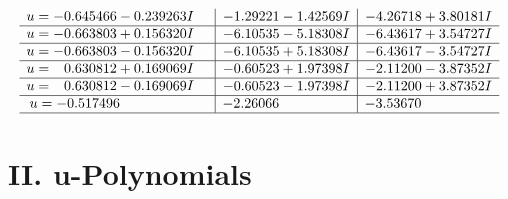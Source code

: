 \documentclass[1p]{elsarticle_modified}
\theoremstyle{definition}
\begin{document}
$$\begin{array}{c|c|c}
\begin{aligned}
u &= -0.645466 - 0.239263 I\end{aligned}
 & -1.29221 - 1.42569 I & -4.26718 + 3.80181 I \\ \hline\begin{aligned}
u &= -0.663803 + 0.156320 I\end{aligned}
 & -6.10535 - 5.18308 I & -6.43617 + 3.54727 I \\ \hline\begin{aligned}
u &= -0.663803 - 0.156320 I\end{aligned}
 & -6.10535 + 5.18308 I & -6.43617 - 3.54727 I \\ \hline\begin{aligned}
u &= \phantom{-}0.630812 + 0.169069 I\end{aligned}
 & -0.60523 + 1.97398 I & -2.11200 - 3.87352 I \\ \hline\begin{aligned}
u &= \phantom{-}0.630812 - 0.169069 I\end{aligned}
 & -0.60523 - 1.97398 I & -2.11200 + 3.87352 I \\ \hline\begin{aligned}
u &= -0.517496\phantom{ +0.000000I}\end{aligned}
 & -2.26066\phantom{ +0.000000I} & -3.53670\phantom{ +0.000000I}\\
 \hline 
 \end{array}$$\newpage
\newpage\renewcommand{\arraystretch}{1}
\centering \section*{ II. u-Polynomials}
\end{document}
